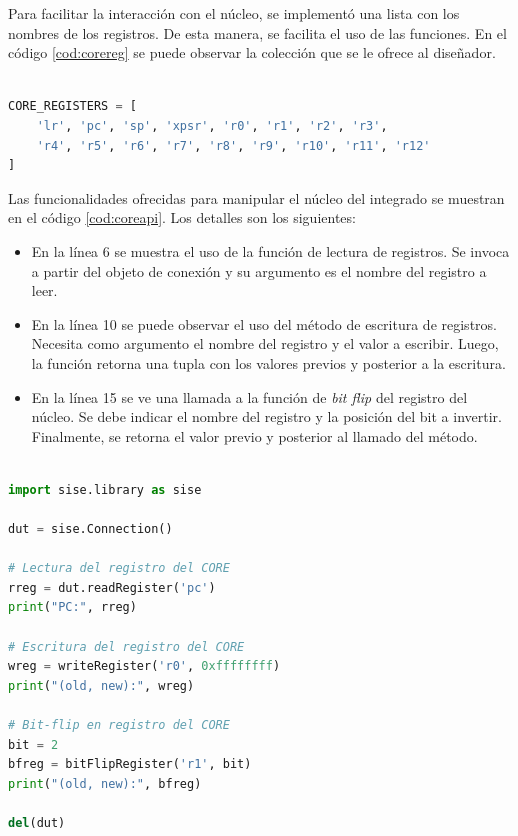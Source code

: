 Para facilitar la interacción con el núcleo, se implementó una lista con los nombres de los registros.
De esta manera, se facilita el uso de las funciones.
En el código \ref{cod:corereg} se puede observar la colección que se le ofrece al diseñador.

\begin{lstlisting}[language=Python,label=cod:corereg,caption=Lista de registros accesibles por el usuario.]  % Start your code-block

CORE_REGISTERS = [
    'lr', 'pc', 'sp', 'xpsr', 'r0', 'r1', 'r2', 'r3',
    'r4', 'r5', 'r6', 'r7', 'r8', 'r9', 'r10', 'r11', 'r12'
]

\end{lstlisting}

Las funcionalidades ofrecidas para manipular el núcleo del integrado se muestran en el código \ref{cod:coreapi}.
Los detalles son los siguientes:

\begin{itemize}
    \item En la línea 6 se muestra el uso de la función de lectura de registros.
        Se invoca a partir del objeto de conexión y su argumento es el nombre del registro a leer.
    \item En la línea 10 se puede observar el uso del método de escritura de registros.
        Necesita como argumento el nombre del registro y el valor a escribir.
        Luego, la función retorna una tupla con los valores previos y posterior a la escritura.
    \item En la línea 15 se ve una llamada a la función de \emph{bit flip} del registro del núcleo.
        Se debe indicar el nombre del registro y la posición del bit a invertir.
        Finalmente, se retorna el valor previo y posterior al llamado del método.
\end{itemize}


\begin{lstlisting}[language=Python,label=cod:coreapi,caption=Ejemplo de uso en registros del núcleo.]  % Start your code-block

import sise.library as sise

dut = sise.Connection()

# Lectura del registro del CORE
rreg = dut.readRegister('pc')
print("PC:", rreg)

# Escritura del registro del CORE
wreg = writeRegister('r0', 0xffffffff)
print("(old, new):", wreg)

# Bit-flip en registro del CORE
bit = 2
bfreg = bitFlipRegister('r1', bit)
print("(old, new):", bfreg)

del(dut)

\end{lstlisting}

